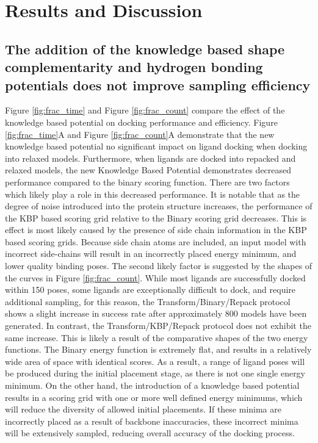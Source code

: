 \section{Results and Discussion}

\subsection{The addition of the knowledge based shape complementarity and hydrogen bonding potentials does not improve sampling efficiency}

Figure \ref{fig:frac_time} and Figure \ref{fig:frac_count} compare the effect of the knowledge based potential on docking performance and efficiency.
Figure \ref{fig:frac_time}A and Figure \ref{fig:frac_count}A demonstrate that the new knowledge based potential no significant impact on ligand docking when docking into relaxed models.
Furthermore, when ligands are docked into repacked and relaxed models, the new Knowledge Based Potential demonstrates decreased performance compared to the binary scoring function. 
There are two factors which likely play a role in this decreased performance.
It is notable that as the degree of noise introduced into the protein structure increases, the performance of the KBP based scoring grid relative to the Binary scoring grid decreases.
This is effect is most likely caused by the presence of side chain information in the KBP based scoring grids.
Because side chain atoms are included, an input model with incorrect side-chains will result in an incorrectly placed energy minimum, and lower quality binding poses. 
The second likely factor is suggested by the shapes of the curves in Figure \ref{fig:frac_count}.
While most ligands are successfully docked within 150 poses, some ligands are exceptionally difficult to dock, and require additional sampling, for this reason, the Transform/Binary/Repack protocol shows a slight increase in success rate after approximately 800 models have been generated.
In contrast, the Transform/KBP/Repack protocol does not exhibit the same increase.
This is likely a result of the comparative shapes of the two energy functions.
The Binary energy function is extremely flat, and results in a relatively wide area of space with identical scores.
As a result, a range of ligand poses will be produced during the initial placement stage, as there is not one single energy minimum.
On the other hand, the introduction of a knowledge based potential results in a scoring grid with one or more well defined energy minimums, which will reduce the diversity of allowed initial placements.
If these minima are incorrectly placed as a result of backbone inaccuracies, these incorrect minima will be extensively sampled, reducing overall accuracy of the docking process. 

